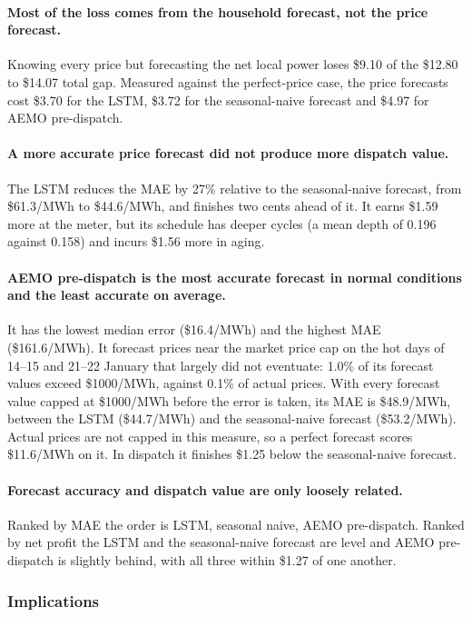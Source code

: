 \paragraph{Most of the loss comes from the household forecast, not the price forecast.}
Knowing every price but forecasting the net local power loses \$9.10 of the
\$12.80 to \$14.07 total gap. Measured against the perfect-price case, the price
forecasts cost \$3.70 for the LSTM, \$3.72 for the seasonal-naive forecast and \$4.97
for AEMO pre-dispatch.

\paragraph{A more accurate price forecast did not produce more dispatch value.}
The LSTM reduces the MAE by 27\% relative to the seasonal-naive forecast, from
\$61.3/MWh to \$44.6/MWh, and finishes two cents ahead of it. It earns \$1.59 more at
the meter, but its schedule has deeper cycles (a mean depth of 0.196 against 0.158) and
incurs \$1.56 more in aging.



\paragraph{AEMO pre-dispatch is the most accurate forecast in normal conditions and the least accurate on average.}
It has the lowest median error (\$16.4/MWh) and the highest MAE (\$161.6/MWh). It
forecast prices near the market price cap on the hot days of 14--15 and 21--22 January
that largely did not eventuate: 1.0\% of its forecast values exceed \$1000/MWh, against
0.1\% of actual prices. With every forecast value capped at \$1000/MWh before the error
is taken, its MAE is \$48.9/MWh, between the LSTM (\$44.7/MWh) and the seasonal-naive
forecast (\$53.2/MWh). Actual prices are not capped in this measure, so a perfect
forecast scores \$11.6/MWh on it. In dispatch it finishes \$1.25 below the seasonal-naive forecast.

\paragraph{Forecast accuracy and dispatch value are only loosely related.}
Ranked by MAE the order is LSTM, seasonal naive, AEMO pre-dispatch. Ranked by net
profit the LSTM and the seasonal-naive forecast are level and AEMO pre-dispatch is
slightly behind, with all three within \$1.27 of one another.


\subsubsection{Implications}
\label{sec:results:mpc:implications}

